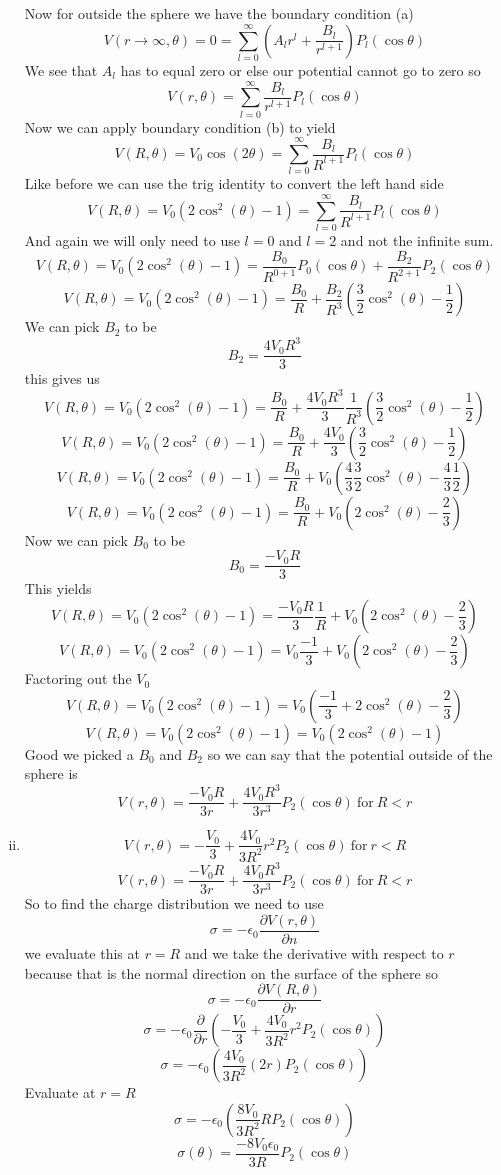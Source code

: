 \documentclass[11pt]{article}
\numberwithin{equation}{section}
\begin{document}
\begin{enumerate}[(i)]
Now for outside the sphere we have the boundary condition (a)
$$V(r\rightarrow\infty,\theta)=0 = \sum_{l=0}^{\infty}\left(A_lr^l+\frac{B_l}{r^{l+1}}\right)P_l(\cos\theta)$$
We see that $A_l$ has to equal zero or else our potential cannot go to zero so
$$V(r,\theta) = \sum_{l=0}^{\infty}\frac{B_l}{r^{l+1}}P_l(\cos\theta)$$
Now we can apply boundary condition (b) to yield
$$V(R,\theta) = V_0\cos(2\theta)= \sum_{l=0}^{\infty}\frac{B_l}{R^{l+1}}P_l(\cos\theta)$$
Like before we can use the trig identity to convert the left hand side
$$V(R,\theta) = V_0(2\cos^2(\theta)-1)= \sum_{l=0}^{\infty}\frac{B_l}{R^{l+1}}P_l(\cos\theta)$$
And again we will only need to use $l=0$ and $l=2$ and not the infinite sum.
$$V(R,\theta) = V_0(2\cos^2(\theta)-1)= \frac{B_0}{R^{0+1}}P_0(\cos\theta)+\frac{B_2}{R^{2+1}}P_2(\cos\theta)$$
$$V(R,\theta) = V_0(2\cos^2(\theta)-1)= \frac{B_0}{R}+\frac{B_2}{R^{3}}\left(\frac{3}{2}\cos^2(\theta) - \frac{1}{2}\right)$$
We can pick $B_2$ to be
$$B_2 = \frac{4V_0R^3}{3}$$
this gives us
$$V(R,\theta) = V_0(2\cos^2(\theta)-1)= \frac{B_0}{R}+\frac{4V_0R^3}{3}\frac{1}{R^{3}}\left(\frac{3}{2}\cos^2(\theta) - \frac{1}{2}\right)$$
$$V(R,\theta) = V_0(2\cos^2(\theta)-1)= \frac{B_0}{R}+\frac{4V_0}{3}\left(\frac{3}{2}\cos^2(\theta) - \frac{1}{2}\right)$$
$$V(R,\theta) = V_0(2\cos^2(\theta)-1)= \frac{B_0}{R}+V_0\left(\frac{4}{3}\frac{3}{2}\cos^2(\theta) - \frac{4}{3}\frac{1}{2}\right)$$
$$V(R,\theta) = V_0(2\cos^2(\theta)-1)= \frac{B_0}{R}+V_0\left(2\cos^2(\theta) - \frac{2}{3}\right)$$
Now we can pick $B_0$ to be
$$B_0 = \frac{-V_0R}{3}$$
This yields
$$V(R,\theta) = V_0(2\cos^2(\theta)-1)= \frac{-V_0R}{3}\frac{1}{R}+V_0\left(2\cos^2(\theta) - \frac{2}{3}\right)$$
$$V(R,\theta) = V_0(2\cos^2(\theta)-1)= V_0\frac{-1}{3}+V_0\left(2\cos^2(\theta) - \frac{2}{3}\right)$$
Factoring out the $V_0$
$$V(R,\theta) = V_0(2\cos^2(\theta)-1)= V_0\left(\frac{-1}{3}+2\cos^2(\theta) - \frac{2}{3}\right)$$
$$V(R,\theta) = V_0(2\cos^2(\theta)-1)= V_0\left(2\cos^2(\theta) - 1\right)$$
Good we picked a $B_0$ and $B_2$ so we can say that the potential outside of the sphere is 
$$V(r,\theta) = \frac{-V_0R}{3r}+\frac{4V_0R^3}{3r^3}P_2(\cos\theta)\ \mbox{for}\ R<r$$

\item
$$V(r,\theta) = -\frac{V_0}{3} + \frac{4V_0}{3R^2}r^2P_2(\cos\theta)\ \mbox{for}\ r<R$$
$$V(r,\theta) = \frac{-V_0R}{3r}+\frac{4V_0R^3}{3r^3}P_2(\cos\theta)\ \mbox{for}\ R<r$$
So to find the charge distribution we need to use
$$\sigma = -\epsilon_0\frac{\partial V(r,\theta)}{\partial n}$$
we evaluate this at $r=R$ and we take the derivative with respect to $r$ because that is the normal direction on the surface of the sphere so
$$\sigma = -\epsilon_0\frac{\partial V(R,\theta)}{\partial r}$$
$$\sigma = -\epsilon_0\frac{\partial}{\partial r}\left(-\frac{V_0}{3} + \frac{4V_0}{3R^2}r^2P_2(\cos\theta)\right)$$
$$\sigma = -\epsilon_0\left(\frac{4V_0}{3R^2}(2r)P_2(\cos\theta)\right)$$
Evaluate at $r=R$
$$\sigma = -\epsilon_0\left(\frac{8V_0}{3R^2}RP_2(\cos\theta)\right)$$
$$\sigma(\theta) = \frac{-8V_0\epsilon_0}{3R}P_2(\cos\theta)$$

\end{enumerate}
\end{document}
